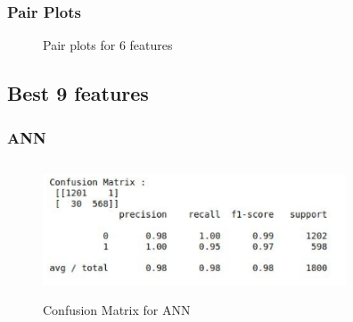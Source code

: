 \subsubsection{Pair Plots}

\begin{figure}[H]
  \noindent{}
\caption{Pair plots for 6 features}
\end{figure}



\subsection{Best 9 features}

\subsubsection{ANN}

\begin{figure}[H]
  \includegraphics[height = 4cm,width= 9cm]{images/9_ANN}
\caption{Confusion Matrix for ANN}
\end{figure}

